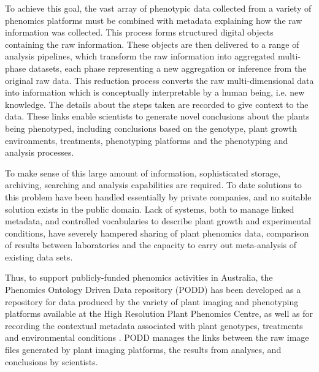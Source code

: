 \documentclass{llncs}
\begin{document}
To achieve this goal, the vast array of phenotypic data collected from a variety
of phenomics platforms must be combined with metadata explaining how the raw
information was collected. This process forms structured digital objects
containing the raw information. These objects are then delivered to a range of
analysis pipelines, which transform the raw information into  aggregated
multi-phase datasets, each phase representing a new aggregation or inference
from the original raw data. This reduction process converts the raw
multi-dimensional data into information which is conceptually interpretable by a
human being, i.e. new knowledge. The details about the steps taken are recorded
to give context to the data. These links enable scientists to generate novel
conclusions about the plants being phenotyped, including conclusions based on
the genotype, plant growth environments, treatments, phenotyping platforms and
the phenotyping and analysis processes.


To make sense of this large amount of information, sophisticated storage,
archiving, searching and analysis capabilities are required. To date solutions
to this problem have been handled essentially by private companies, and no
suitable solution exists in the public domain. Lack of systems, both to manage
linked metadata, and controlled vocabularies to describe plant growth and
experimental conditions, have severely hampered sharing of plant phenomics data,
comparison of results between laboratories and the capacity to carry out
meta-analysis of existing data sets.


Thus, to support publicly-funded phenomics activities in Australia, the
Phenomics Ontology Driven Data repository (PODD) has been developed as a
repository for data produced by the variety of plant imaging and phenotyping
platforms available at the High Resolution Plant Phenomics Centre, as well as
for recording the contextual metadata associated with plant genotypes,
treatments and environmental conditions \cite{Li2010}. PODD manages the links between the
raw image files generated by plant imaging platforms, the results from analyses,
and conclusions by scientists.
\end{document}
